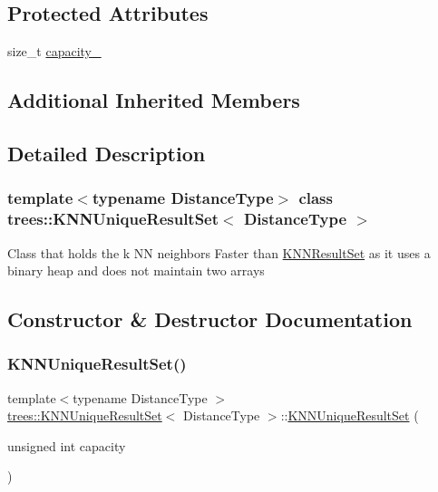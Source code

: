 \subsection*{Protected Attributes}
\begin{DoxyCompactItemize}
\item 
size\+\_\+t \hyperlink{classtrees_1_1_k_n_n_unique_result_set_a52a3e1ea392eeace263f540865a55250}{capacity\+\_\+}
\end{DoxyCompactItemize}
\subsection*{Additional Inherited Members}


\subsection{Detailed Description}
\subsubsection*{template$<$typename Distance\+Type$>$\newline
class trees\+::\+K\+N\+N\+Unique\+Result\+Set$<$ Distance\+Type $>$}

Class that holds the k NN neighbors Faster than \hyperlink{classtrees_1_1_k_n_n_result_set}{K\+N\+N\+Result\+Set} as it uses a binary heap and does not maintain two arrays 

\subsection{Constructor \& Destructor Documentation}
\mbox{\label{classtrees_1_1_k_n_n_unique_result_set_a97620bc6b7febbe8c1885e7191fadf86}} 
\subsubsection{\texorpdfstring{K\+N\+N\+Unique\+Result\+Set()}{KNNUniqueResultSet()}}
{\footnotesize\ttfamily template$<$typename Distance\+Type $>$ \\
\hyperlink{classtrees_1_1_k_n_n_unique_result_set}{trees\+::\+K\+N\+N\+Unique\+Result\+Set}$<$ Distance\+Type $>$\+::\hyperlink{classtrees_1_1_k_n_n_unique_result_set}{K\+N\+N\+Unique\+Result\+Set} (\begin{DoxyParamCaption}\item[{unsigned int}]{capacity }\end{DoxyParamCaption})\hspace{0.3cm}{\ttfamily [inline]}}

